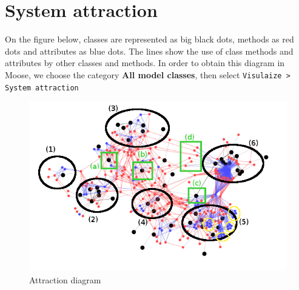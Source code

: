 \section{System attraction}
On the figure below, classes are represented as big black dots, methods as red dots and attributes as blue dots. The lines show the use of class methods and attributes by other classes and methods. In order to obtain this diagram in Moose, we choose the category \textbf{All model classes}, then select \texttt{Visulaize > System attraction}


\begin{figure}[H]
    \includegraphics[width=\textwidth]{Attraction_annotated.png}
    \caption{\label{fig:attraction} Attraction diagram}
\end{figure}

